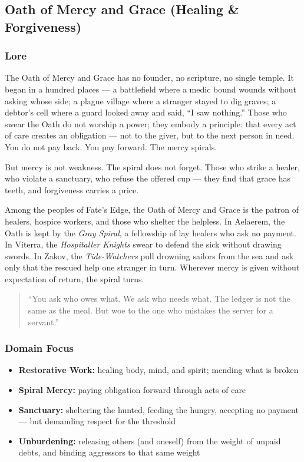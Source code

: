 
\subsection{Oath of Mercy and Grace (Healing \& Forgiveness)}

\subsubsection*{Lore}
The Oath of Mercy and Grace has no founder, no scripture, no single temple. It began in a hundred places --- a battlefield where a medic bound wounds without asking whose side; a plague village where a stranger stayed to dig graves; a debtor's cell where a guard looked away and said, ``I saw nothing.'' Those who swear the Oath do not worship a power; they embody a principle: that every act of care creates an obligation --- not to the giver, but to the next person in need. You do not pay back. You pay forward. The mercy spirals.

But mercy is not weakness. The spiral does not forget. Those who strike a healer, who violate a sanctuary, who refuse the offered cup --- they find that grace has teeth, and forgiveness carries a price.

Among the peoples of Fate's Edge, the Oath of Mercy and Grace is the patron of healers, hospice workers, and those who shelter the helpless. In Aelaerem, the Oath is kept by the \textit{Gray Spiral}, a fellowship of lay healers who ask no payment. In Viterra, the \textit{Hospitaller Knights} swear to defend the sick without drawing swords. In Zakov, the \textit{Tide-Watchers} pull drowning sailors from the sea and ask only that the rescued help one stranger in turn. Wherever mercy is given without expectation of return, the spiral turns.

\begin{quote}
``You ask who owes what. We ask who needs what. The ledger is not the same as the meal. But woe to the one who mistakes the server for a servant.''
\end{quote}

\subsubsection*{Domain Focus}
\begin{itemize}
  \item \textbf{Restorative Work:} healing body, mind, and spirit; mending what is broken
  \item \textbf{Spiral Mercy:} paying obligation forward through acts of care
  \item \textbf{Sanctuary:} sheltering the hunted, feeding the hungry, accepting no payment --- but demanding respect for the threshold
  \item \textbf{Unburdening:} releasing others (and oneself) from the weight of unpaid debts, and binding aggressors to that same weight
\end{itemize}

